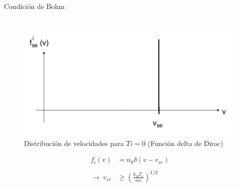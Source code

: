 \documentclass[11pt]{beamer}
\begin{document}
   \begin{frame}[t]{Condici\'on de Bohm}
    \fontsize{6pt}{8}\selectfont
   \begin{columns}
   \begin{column}{0.4\textwidth}
   \begin{figure}
       \centering
       \includegraphics[width=\textwidth]{delta.jpg}
       \caption{Distribuci\'on de velocidades para $Ti=0$ (Funci\'on delta de Dirac)}
       \label{fig:my_label}
   \end{figure}
   \begin{align*}
        f_i(v) &= n_0\delta\left(v - v_{se} \right) \\ \\
        \rightarrow \ v_{se} &\geq \left(\frac{k_BT_e}{mi}\right)^{1/2}
    \end{align*} 
   \end{column}
   

\end{columns}
\end{frame}
\end{document}

